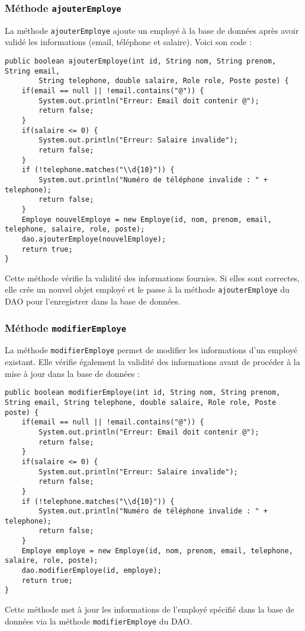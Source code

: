 \documentclass[a4paper,12pt]{report}
\begin{document}
\subsubsection{Méthode \texttt{ajouterEmploye}}
La méthode \texttt{ajouterEmploye} ajoute un employé à la base de données après avoir validé les informations (email, téléphone et salaire). Voici son code :
\begin{verbatim}
public boolean ajouterEmploye(int id, String nom, String prenom, String email,
        String telephone, double salaire, Role role, Poste poste) {
    if(email == null || !email.contains("@")) {
        System.out.println("Erreur: Email doit contenir @");
        return false;
    }
    if(salaire <= 0) {
        System.out.println("Erreur: Salaire invalide");
        return false;
    }
    if (!telephone.matches("\\d{10}")) { 
        System.out.println("Numéro de téléphone invalide : " + telephone);
        return false;
    }
    Employe nouvelEmploye = new Employe(id, nom, prenom, email, telephone, salaire, role, poste);
    dao.ajouterEmploye(nouvelEmploye);
    return true;
}
\end{verbatim}
Cette méthode vérifie la validité des informations fournies. Si elles sont correctes, elle crée un nouvel objet employé et le passe à la méthode \texttt{ajouterEmploye} du DAO pour l'enregistrer dans la base de données.

\subsubsection{Méthode \texttt{modifierEmploye}}
La méthode \texttt{modifierEmploye} permet de modifier les informations d'un employé existant. Elle vérifie également la validité des informations avant de procéder à la mise à jour dans la base de données :
\begin{verbatim}
public boolean modifierEmploye(int id, String nom, String prenom, String email, String telephone, double salaire, Role role, Poste poste) {
    if(email == null || !email.contains("@")) {
        System.out.println("Erreur: Email doit contenir @");
        return false;
    }
    if(salaire <= 0) {
        System.out.println("Erreur: Salaire invalide");
        return false;
    }
    if (!telephone.matches("\\d{10}")) { 
        System.out.println("Numéro de téléphone invalide : " + telephone);
        return false;
    }
    Employe employe = new Employe(id, nom, prenom, email, telephone, salaire, role, poste);
    dao.modifierEmploye(id, employe);
    return true;
}
\end{verbatim}
Cette méthode met à jour les informations de l'employé spécifié dans la base de données via la méthode \texttt{modifierEmploye} du DAO.
\end{document}
